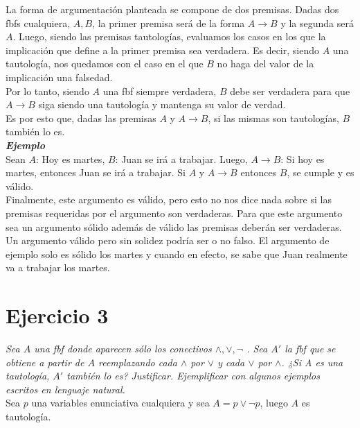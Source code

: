 \documentclass[osajnl,twocolumn,showpacs,superscriptaddress,10pt]{revtex4-1} %
\begin{document}
La forma de argumentación planteada se compone de dos premisas. Dadas dos fbfs cualquiera, $A, B$, la primer premisa será de la forma $A \rightarrow B$ y la segunda será $A$. Luego, siendo las premisas tautologías,
evaluamos los casos en los que la implicación que define a la primer premisa sea verdadera. Es decir, siendo $A$ una tautología, nos quedamos con el caso en el que $B$ no haga del valor de la implicación una falsedad. \\

Por lo tanto, siendo $A$ una fbf siempre verdadera, $B$ debe ser verdadera para que $A \rightarrow B$ siga siendo una tautología y mantenga su valor de verdad. \\

Es por esto que, dadas las premisas $A$ y $A \rightarrow B$, si las mismas son tautologías, $B$ también lo es. \\

\textbf{\textit{Ejemplo}} \\

Sean $A$: Hoy es martes, $B$: Juan se irá a trabajar. Luego, $A \rightarrow B$: Si hoy es martes, entonces Juan se irá a trabajar. Si $A$ y $A \rightarrow B$ entonces $B$, se cumple y es válido. \\

Finalmente, este argumento es válido, pero esto no nos dice nada sobre si las premisas requeridas por el argumento son verdaderas. Para que este argumento sea un argumento sólido además de válido las premisas deberán ser verdaderas. \\

Un argumento válido pero sin solidez podría ser o no falso. El argumento de ejemplo solo es sólido los martes y cuando en efecto, se sabe que Juan realmente va a trabajar los martes. \\

\section{Ejercicio 3}

\textit{Sea $A$ una fbf donde aparecen sólo los conectivos $\wedge, \vee, \neg$ . Sea $A'$ la fbf que se obtiene a partir de $A$ reemplazando cada $\wedge$ por $\vee$ y cada $\vee$ por $\wedge$. ¿Si A es una tautología, $A'$ también lo es? Justificar. Ejemplificar con algunos ejemplos escritos en lenguaje natural.} \\

Sea $p$ una variables enunciativa cualquiera y sea $A = p \vee \neg p$, luego $A$ es tautología. \\
\end{document}

